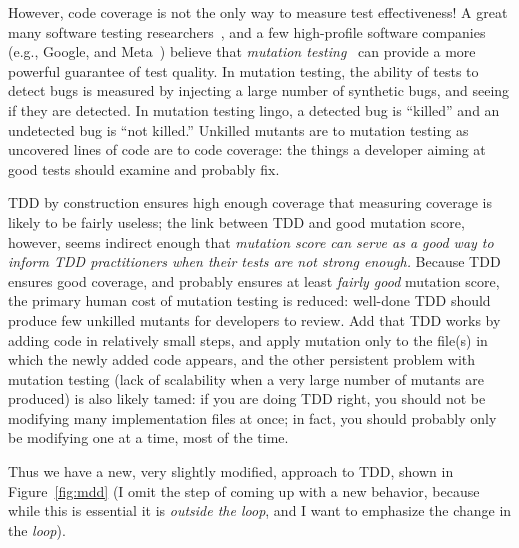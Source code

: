 \documentclass[sigplan,screen]{acmart}
\begin{document}
However, code coverage is not the
only way to measure test effectiveness!  A great many software testing
researchers~\cite{JustMut,CleanCode,Discontents,MutationSurvey}, and a few high-profile software companies (e.g., Google,
and Meta~\cite{PetrovicMutationGoogle,BellerFacebookMutation}) believe that \emph{mutation testing}~\cite{demillo1978hints,budd1979mutation} can provide a more
powerful guarantee of test quality.  In mutation testing, the ability
of tests to detect bugs is measured by injecting a large number of
synthetic bugs, and seeing if they are detected.  In mutation
testing lingo, a detected bug is ``killed'' and an undetected bug is
``not killed.''  Unkilled mutants are to mutation testing as uncovered
lines of code are to code coverage:  the things a developer aiming at
good tests should examine and probably fix.

TDD by construction ensures high enough coverage that
measuring coverage is likely to be fairly useless; the link between TDD
and good mutation score, however, seems indirect enough that
\emph{mutation score can serve as a good way to inform TDD
  practitioners when their tests are not strong enough.}   Because TDD
ensures good coverage, and probably ensures at least \emph{fairly
  good} mutation score, the primary human cost of mutation testing is
reduced:  well-done TDD should produce few unkilled mutants for
developers to review.  Add that TDD works by adding code in relatively
small steps, and apply mutation only to the file(s) in which the newly
added code appears, and the other persistent problem with mutation testing (lack of
scalability when a very large number of mutants are produced) is also
likely tamed: if you are doing TDD right, you should not be modifying
many implementation files at once; in fact, you should probably only
be modifying one at a time, most of the time.

Thus we have a new, very slightly modified, approach to TDD, shown in
Figure~\ref{fig:mdd} (I omit the step of coming up with a new
behavior, because while this is essential it is \emph{outside the
  loop}, and I want to emphasize the change in the \emph{loop}).
\end{document}
